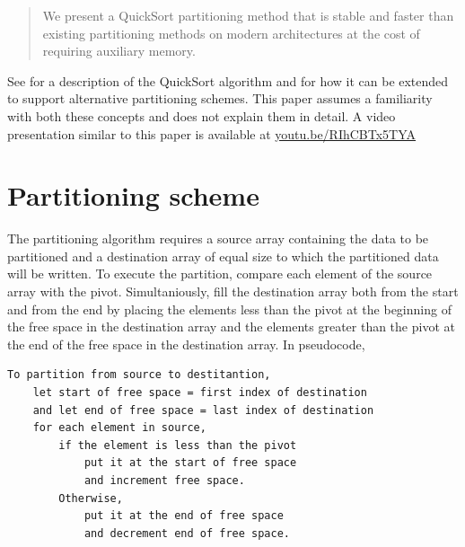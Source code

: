 \documentclass{juliacon}
\begin{document}
\maketitle

\begin{abstract}



We present a QuickSort partitioning method that is stable and faster than existing partitioning methods on modern architectures at the cost of requiring auxiliary memory.

\headingtable

\end{abstract}

See \cite{quicksort} for a description of the QuickSort algorithm and \cite{lomuto} for how it can be extended to support alternative partitioning schemes. This paper assumes a familiarity with both these concepts and does not explain them in detail. A video presentation similar to this paper is available at \href{https://youtu.be/RIhCBTx5TYA}{youtu.be/RIhCBTx5TYA}

\section{Partitioning scheme}

The partitioning algorithm requires a source array containing the data to be partitioned and a destination array of equal size to which the partitioned data will be written. To execute the partition, compare each element of the source array with the pivot. Simultaniously, fill the destination array both from the start and from the end by placing the elements less than the pivot at the beginning of the free space in the destination array and the elements greater than the pivot at the end of the free space in the destination array. In pseudocode,

\begin{lstlisting}
To partition from source to destitantion,
    let start of free space = first index of destination
    and let end of free space = last index of destination
    for each element in source,
        if the element is less than the pivot
            put it at the start of free space
            and increment free space.
        Otherwise,
            put it at the end of free space
            and decrement end of free space.
\end{lstlisting}
\end{document}
